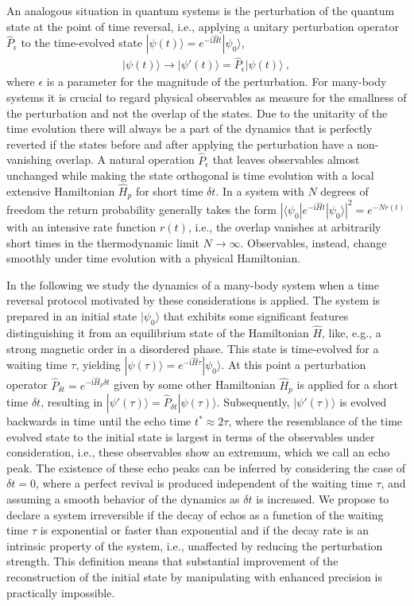 \documentclass[%
 reprint,
unsortedaddress,
 amsmath,amssymb,
 prl,
]{revtex4-1}
\newcommand{\im}{\mathrm{i}}
\begin{document}
An analogous situation in quantum systems is the perturbation of the quantum state at the point of 
time reversal, i.e., applying a unitary perturbation operator $\hat P_\epsilon$ to the time-evolved state
$|\psi(t)\rangle=e^{-\im\hat Ht}|\psi_0\rangle$,
\begin{align}
	|\psi(t)\rangle\to|\psi'(t)\rangle=\hat P_\epsilon|\psi(t)\rangle\ ,
\end{align}
where $\epsilon$ is a parameter for the magnitude of the perturbation.
For many-body systems it is crucial to regard physical observables as measure for
the smallness of the perturbation and not the overlap of the states. Due to the unitarity of the
time evolution there will always be a part of the dynamics that is perfectly reverted if the
states before and after applying the perturbation have a non-vanishing overlap. 
A natural operation $\hat P_\epsilon$ 
that leaves observables almost unchanged while making the state orthogonal is time evolution
with a local extensive Hamiltonian $\hat H_p$ for short time $\delta t$. In a
system with $N$ degrees of freedom the return probability generally takes the form $|\langle\psi_0|e^{-\im\hat Ht}|\psi_0\rangle|^2=e^{-Nr(t)}$ with
an intensive rate function $r(t)$, i.e., the overlap vanishes at arbitrarily short times
in the thermodynamic limit $N\to\infty$. Observables, instead, change smoothly under time evolution
with a physical Hamiltonian.

In the following we study the dynamics of a many-body system when a time reversal protocol
motivated by these considerations is applied. The system is prepared in an initial state 
$|\psi_0\rangle$ that exhibits some significant features distinguishing it from an equilibrium state of the Hamiltonian $\hat H$, like, e.g., a strong magnetic order in a disordered phase. 
This state is time-evolved for a waiting time $\tau$, yielding $|\psi(\tau)\rangle=e^{-\im\hat H\tau}|\psi_0\rangle$.
At this point a perturbation operator $\hat P_{\delta t}=e^{-\im\hat H_p\delta t}$ given by some other
Hamiltonian $\hat H_p$ is applied for a short time $\delta t$, resulting in 
$|\psi'(\tau)\rangle=\hat P_{\delta t}|\psi(\tau)\rangle$. 
Subsequently, $|\psi'(\tau)\rangle$ is evolved backwards
in time until the echo time $t^*\approx 2\tau$, where the resemblance of the time evolved state
to the initial state is largest in terms of the observables under consideration, i.e., these observables
show an extremum, which we call an echo peak. The existence of these echo peaks can be inferred
by considering the case of $\delta t=0$, where a perfect revival is produced independent of the
waiting time $\tau$, and assuming a smooth behavior of the dynamics as $\delta t$ is increased.
We propose to declare a system irreversible if the decay of echos as a function of the waiting time $\tau$
is exponential or faster than exponential and if the decay rate is an intrinsic property of the system, i.e.,
unaffected by reducing the perturbation strength. This definition means that substantial improvement
of the reconstruction of the initial state by manipulating with enhanced precision is practically impossible.
\end{document}

